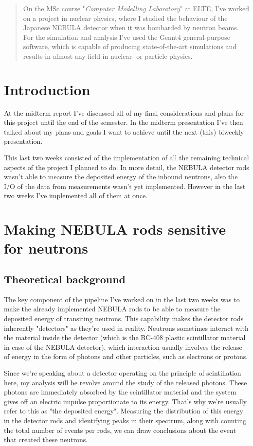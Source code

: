 \begin{abstract}
	On the MSc course "\textit{Computer Modelling Laboratory}" at ELTE, I've worked on a project in nuclear physics, where I studied the behaviour of the Japanese NEBULA detector when it was bombarded by neutron beams. For the simulation and analysis I've used the Geant4 general-purpose software, which is capable of producing state-of-the-art simulations and results in almost any field in nuclear- or particle physics.
\end{abstract}

\begin{multicols}{2}
\section{Introduction}
At the midterm report I've discussed all of my final considerations and plans for this project until the end of the semester. In the midterm presentation I've then talked about my plans and goals I want to achieve until the next (this) biweekly presentation.

This last two weeks consisted of the implementation of all the remaining technical aspects of the project I planned to do. In more detail, the NEBULA detector rods wasn't able to measure the deposited energy of the inbound neutrons, also the I/O of the data from measurements wasn't yet implemented. However in the last two weeks I've implemented all of them at once.

\section{Making NEBULA rods sensitive for neutrons}
\subsection{Theoretical background}
The key component of the pipeline I've worked on in the last two weeks was to make the already implemented NEBULA rods to be able to measure the deposited energy of transiting neutrons. This capability makes the detector rods inherently "detectors" as they're used in reality. Neutrons sometimes interact with the material inside the detector (which is the BC-$408$ plastic scintillator material in case of the NEBULA detector), which interaction usually involves the release of energy in the form of photons and other particles, such as electrons or protons.

Since we're speaking about a detector operating on the principle of scintillation here, my analysis will be revolve around the study of the released photons. These photons are immediately absorbed by the scintillator material and the system gives off an electric impulse proportionate to its energy. That's why we're usually refer to this as "the deposited energy". Measuring the distribution of this energy in the detector rods and identifying peaks in their spectrum, along with counting the total number of events per rods, we can draw conclusions about the event that created these neutrons.


\end{multicols}
